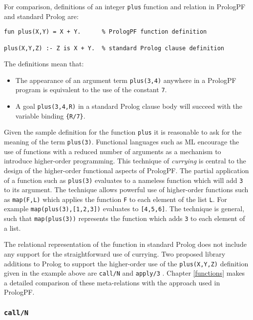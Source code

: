 For comparison, definitions of an integer \texttt{plus} function and relation in
PrologPF and standard Prolog are:
\begin{verbatim}
fun plus(X,Y) = X + Y.      % PrologPF function definition

plus(X,Y,Z) :- Z is X + Y.  % standard Prolog clause definition
\end{verbatim}
The definitions mean that:
\begin{itemize}
\item{The appearance of an argument term \texttt{plus(3,4)} anywhere in a 
  PrologPF program is equivalent to the use of the constant \texttt{7}.}
\item{A goal \texttt{plus(3,4,R)} in a standard Prolog clause body will
  succeed with the variable binding \texttt{\{R/7\}}.}
\end{itemize}
Given the sample definition for the function \texttt{plus} it is reasonable to
ask for the meaning of the term \texttt{plus(3)}.  Functional languages such
as ML \cite{MTH90, Pau91} encourage the use of functions with a reduced number of
arguments as a mechanism to introduce higher-order programming.  This technique
of \textit{currying} \cite{Cur30,Sch24} is central to the design of the 
higher-order functional
aspects of PrologPF.  The partial application of a function such as \texttt{plus(3)}
evaluates to a nameless function which will add \texttt{3} to its argument.  The
technique allows powerful use of higher-order functions such as \texttt{map(F,L)}
which applies the function \texttt{F} to each element of the list \texttt{L}. For
example \texttt{map(plus(3),[1,2,3])} evaluates to \texttt{[4,5,6]}.
The technique is general, such that \texttt{map(plus(3))} represents the function
which adds \texttt{3} to each element of a list.

The relational representation of the function in standard Prolog does not include any
support for the straightforward use of currying.  Two proposed
library additions to Prolog to
support the higher-order use of the \texttt{plus(X,Y,Z)} definition given in the example
above are \texttt{call/N} and \texttt{apply/3} \cite{Nai96}.  Chapter \ref{functions}
makes a detailed comparison of these meta-relations with the approach used in PrologPF.

\subsubsection{\texttt{call/N}}

